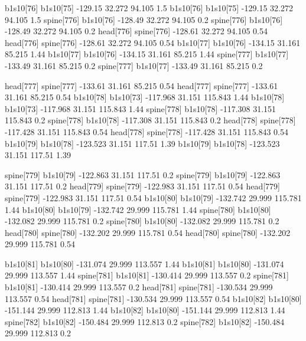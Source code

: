 b1s10[76]    b1s10[75]    -129.15    32.272    94.105    1.5
b1s10[76]    b1s10[75]    -129.15    32.272    94.105    1.5
spine[776]    b1s10[76]    -128.49    32.272    94.105    0.2
spine[776]    b1s10[76]    -128.49    32.272    94.105    0.2
head[776]    spine[776]    -128.61    32.272    94.105    0.54
head[776]    spine[776]    -128.61    32.272    94.105    0.54
b1s10[77]    b1s10[76]    -134.15    31.161    85.215    1.44
b1s10[77]    b1s10[76]    -134.15    31.161    85.215    1.44
spine[777]    b1s10[77]    -133.49    31.161    85.215    0.2
spine[777]    b1s10[77]    -133.49    31.161    85.215    0.2


head[777]    spine[777]    -133.61    31.161    85.215    0.54
head[777]    spine[777]    -133.61    31.161    85.215    0.54
b1s10[78]    b1s10[73]    -117.968    31.151    115.843    1.44
b1s10[78]    b1s10[73]    -117.968    31.151    115.843    1.44
spine[778]    b1s10[78]    -117.308    31.151    115.843    0.2
spine[778]    b1s10[78]    -117.308    31.151    115.843    0.2
head[778]    spine[778]    -117.428    31.151    115.843    0.54
head[778]    spine[778]    -117.428    31.151    115.843    0.54
b1s10[79]    b1s10[78]    -123.523    31.151    117.51    1.39
b1s10[79]    b1s10[78]    -123.523    31.151    117.51    1.39


spine[779]    b1s10[79]    -122.863    31.151    117.51    0.2
spine[779]    b1s10[79]    -122.863    31.151    117.51    0.2
head[779]    spine[779]    -122.983    31.151    117.51    0.54
head[779]    spine[779]    -122.983    31.151    117.51    0.54
b1s10[80]    b1s10[79]    -132.742    29.999    115.781    1.44
b1s10[80]    b1s10[79]    -132.742    29.999    115.781    1.44
spine[780]    b1s10[80]    -132.082    29.999    115.781    0.2
spine[780]    b1s10[80]    -132.082    29.999    115.781    0.2
head[780]    spine[780]    -132.202    29.999    115.781    0.54
head[780]    spine[780]    -132.202    29.999    115.781    0.54


b1s10[81]    b1s10[80]    -131.074    29.999    113.557    1.44
b1s10[81]    b1s10[80]    -131.074    29.999    113.557    1.44
spine[781]    b1s10[81]    -130.414    29.999    113.557    0.2
spine[781]    b1s10[81]    -130.414    29.999    113.557    0.2
head[781]    spine[781]    -130.534    29.999    113.557    0.54
head[781]    spine[781]    -130.534    29.999    113.557    0.54
b1s10[82]    b1s10[80]    -151.144    29.999    112.813    1.44
b1s10[82]    b1s10[80]    -151.144    29.999    112.813    1.44
spine[782]    b1s10[82]    -150.484    29.999    112.813    0.2
spine[782]    b1s10[82]    -150.484    29.999    112.813    0.2


